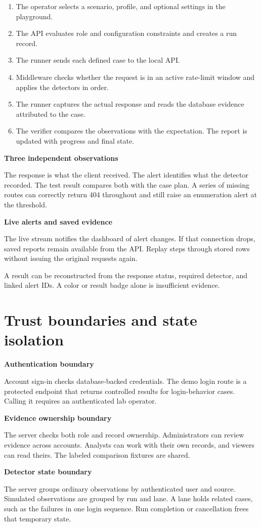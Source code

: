 \documentclass[11pt,a4paper,oneside]{report}
\newcommand{\topic}[1]{\par\addvspace{4pt}\noindent\textbf{#1}\par\nobreak\vspace{-.20em}}
\newcommand{\sheet}[1]{\clearpage\section{#1}}
\newcommand{\callout}[1]{\noindent\colorbox{papergray}{\parbox{\dimexpr\linewidth-2\fboxsep\relax}{\small\strut #1\strut}}}
\begin{document}
\begin{enumerate}
\item The operator selects a scenario, profile, and optional settings in the playground.
\item The API evaluates role and configuration constraints and creates a run record.
\item The runner sends each defined case to the local API.
\item Middleware checks whether the request is in an active rate-limit window and applies the detectors in order.
\item The runner captures the actual response and reads the database evidence attributed to the case.
\item The verifier compares the observations with the expectation. The report is updated with progress and final state.
\end{enumerate}

\topic{Three independent observations}
The response is what the client received. The alert identifies what the detector recorded. The test result compares both with the case plan. A series of missing routes can correctly return 404 throughout and still raise an enumeration alert at the threshold.

\topic{Live alerts and saved evidence}
The live stream notifies the dashboard of alert changes. If that connection drops, saved reports remain available from the API. Replay steps through stored rows without issuing the original requests again.

\callout{A result can be reconstructed from the response status, required detector, and linked alert IDs. A color or result badge alone is insufficient evidence.}

\sheet{Trust boundaries and state isolation}
\topic{Authentication boundary}
Account sign-in checks database-backed credentials. The demo login route is a protected endpoint that returns controlled results for login-behavior cases. Calling it requires an authenticated lab operator.

\topic{Evidence ownership boundary}
The server checks both role and record ownership. Administrators can review evidence across accounts. Analysts can work with their own records, and viewers can read theirs. The labeled comparison fixtures are shared.

\topic{Detector state boundary}
The server groups ordinary observations by authenticated user and source. Simulated observations are grouped by run and lane. A lane holds related cases, such as the failures in one login sequence. Run completion or cancellation frees that temporary state.
\end{document}

